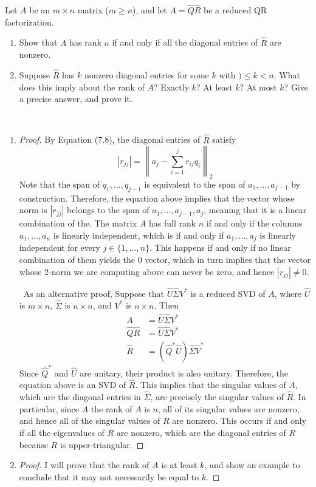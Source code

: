 \documentclass[12pt]{article}
\newenvironment{ex}[2][Exercise]{\begin{trivlist}
		\item[\hskip \labelsep {\bfseries #1}\hskip \labelsep {\bfseries #2.}]}{\end{trivlist}}
\newenvironment{sol}[1][Solution]{\begin{trivlist}
		\item[\hskip \labelsep {\bfseries #1:}]}{\end{trivlist}}
\begin{document}
\begin{ex}{5}
	Let $A$ be an $m\times n$ matrix ($m\geq n$), and let $A=\hat{Q}\hat{R}$ be a reduced QR factorization.
	\begin{enumerate}[label=(\alph*)]
		\item Show that $A$ has rank $n$ if and only if all the diagonal entries of $\hat{R}$ are nonzero.
		\item Suppose $\hat{R}$ has $k$ nonzero diagonal entries for some $k$ with $)\leq k<n$.
		What does this imply about the rank of $A$? Exactly $k$? At least $k$? At most $k$? Give a precise
		answer, and prove it.
	\end{enumerate}
\end{ex}

\begin{sol}
	\
	\begin{enumerate}[label=(\alph*)]
		\item \begin{proof}
			By Equation (7.8), the diagonal entries of $\hat{R}$ satisfy
			\[
			|r_{jj}|=\left\lVert a_j-\sum_{i=1}^{j}r_{ij}q_i\right\rVert_2
			\]
			Note that the span of $q_1,\ldots, q_{j-1}$ is equivalent to the span of $a_1,\ldots,a_{j-1}$
			by construction. Therefore, the equation above implies that the vector whose norm is $|r_{jj}|$
			belongs to the span of $a_1,\ldots,a_{j-1},a_j$, meaning that it is a linear combination of the.
			The matrix $A$ has full rank $n$ if and only if the columns $a_1,\ldots,a_n$ is linearly independent,
			which is if and only if $a_1,\ldots,a_j$ is linearly independent for every $j\in\{1,\ldots,n\}$.
			This happens if and only if no linear combination of them yields the 0 vector, which in turn
			implies that the vector whose 2-norm we are computing above can never be zero, and hence $|r_{jj}|\neq 0$.
			
			\
			As an alternative proof, Suppose that $\hat{U}\hat{\Sigma}V^*$ is a reduced SVD of $A$, where
			$\hat{U}$ is $m\times n$, $\hat{\Sigma}$ is $n\times n$, and $V^*$ is $n\times n$. Then
			\begin{align*}
				A&=\hat{U}\hat{\Sigma}V^*\\
				\hat{Q}\hat{R}&=\hat{U}\hat{\Sigma}V^*\\
				\hat{R}&=(\hat{Q}^*\hat{U})\hat{\Sigma}\hat{V}^*
			\end{align*}
			Since $\hat{Q}^*$ and $\hat{U}$ are unitary, their product is also unitary. Therefore,
			the equation above is an SVD of $\hat{R}$. This implies that the singular values of $A$,
			which are the diagonal entries in $\hat{\Sigma}$, are precisely the singular values of
			$\hat{R}$. In particular, since $A$ the rank of $A$ is $n$, all of its singular values
			are nonzero, and hence all of the singular values of $R$ are nonzero. This occurs
			if and only if all the eigenvalues of $R$ are nonzero, which are the diagonal entries of
			$R$ because $R$ is upper-triangular.
		\end{proof}
		\item \begin{proof}
			I will prove that the rank of $A$ is at least $k$, and show an example to conclude
			that it may not necessarily be equal to $k$.
			

\end{proof}
\end{enumerate}
\end{sol}
\end{document}

